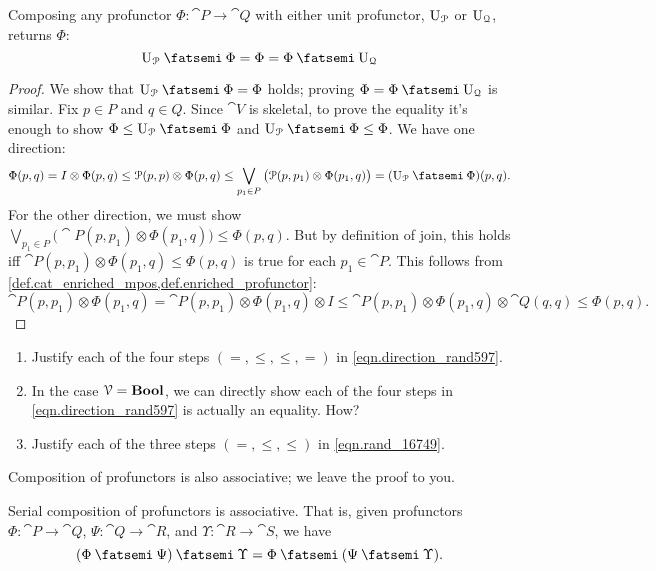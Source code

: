 \documentclass[7Sketches]{subfiles}
\begin{document}
\begin{lemma}%
\label{lemma:unital_serial}
Composing any profunctor $\Phi\colon\cat{P}\to\cat{Q}$ with either unit profunctor, $\mathrm{U}_{\mathcal{P}}$ or $\mathrm{U}_{\mathcal{Q}}$, returns $\Phi$:
\[\Unit{\cat{P}}\cp\Phi=\Phi=\Phi\cp\Unit{\cat{Q}}\]
\end{lemma}
\begin{proof}
We show that $\Unit{\cat{P}}\cp\Phi=\Phi$ holds; proving
$\Phi=\Phi\cp\Unit{\cat{Q}}$ is similar. Fix $p\in P$ and $q\in Q$. Since
$\cat{V}$ is skeletal, to prove the equality it's enough to show
$\Phi\leq\Unit{\cat{P}}\cp\Phi$ and $\Unit{\cat{P}}\cp\Phi\leq\Phi$. We have one
direction:
\begin{equation}%
\label{eqn.direction_rand597}
	\Phi(p,q)= I\otimes\Phi(p,q)\leq\cat{P}(p,p)\otimes\Phi(p,q)\leq\bigvee_{p_1\in P}\big(\cat{P}(p,p_1)\otimes\Phi(p_1,q)\big)=(\Unit{\cat{P}}\cp\Phi)(p,q).
\end{equation}
For the other direction, we must show $\bigvee_{p_1\in P}\big(\cat{P}(p,p_1)\otimes\Phi(p_1,q)\big)\leq\Phi(p,q)$. But by definition of join, this holds iff $\cat{P}(p,p_1)\otimes\Phi(p_1,q)\leq\Phi(p,q)$ is true for each $p_1\in\cat{P}$. This follows from \cref{def.cat_enriched_mpos,def.enriched_profunctor}:
\begin{equation}%
\label{eqn.rand_16749}
  \cat{P}(p,p_1)\otimes\Phi(p_1,q)=\cat{P}(p,p_1)\otimes\Phi(p_1,q)\otimes I\leq\cat{P}(p,p_1)\otimes\Phi(p_1,q)\otimes\cat{Q}(q,q)\leq\Phi(p,q).
\end{equation}
\end{proof}

\begin{exercise} %
\label{exc.prof_unitality}
\begin{enumerate}
  \item Justify each of the four steps $(=, \leq, \leq, =)$ in
  \cref{eqn.direction_rand597}.
  \item In the case $\mathcal{V}=\mathbf{Bool}$, we can directly show each of the four steps
  in \cref{eqn.direction_rand597} is actually an equality. How? 
  \item Justify each of the three steps $(=,\leq,\leq)$ in \cref{eqn.rand_16749}.
\qedhere
\end{enumerate}
\end{exercise}


Composition of profunctors is also associative; we leave the proof to you. 

\begin{lemma}%
\label{lemma:assoc_serial}%
Serial composition of profunctors is associative. That is, given profunctors $\Phi\colon\cat{P}\to\cat{Q}$, $\Psi\colon\cat{Q}\to\cat{R}$, and $\Upsilon\colon\cat{R}\to\cat{S}$, we have
\[(\Phi\cp\Psi)\cp\Upsilon=\Phi\cp(\Psi\cp\Upsilon).\]
\end{lemma}
\end{document}
